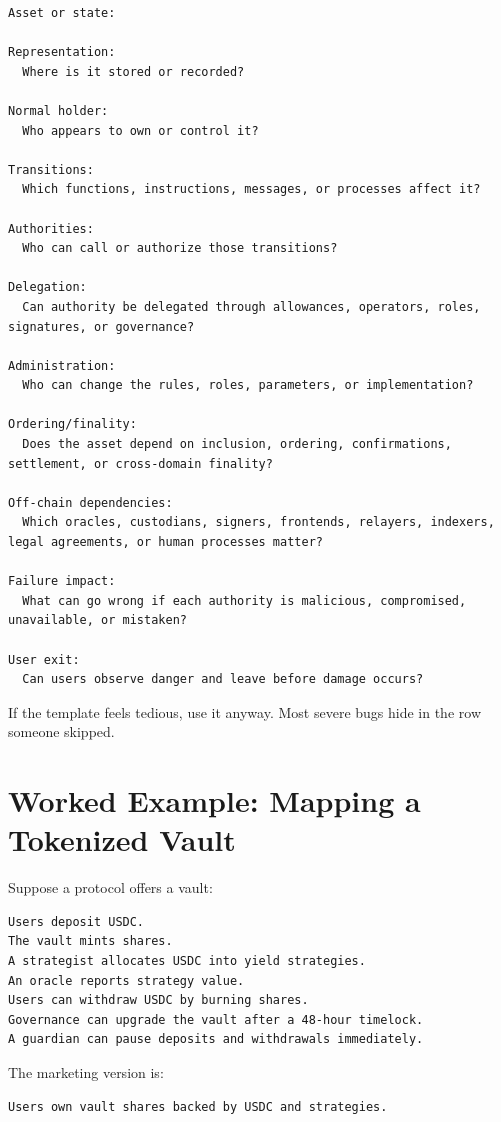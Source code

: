 \begin{lstlisting}
Asset or state:

Representation:
  Where is it stored or recorded?

Normal holder:
  Who appears to own or control it?

Transitions:
  Which functions, instructions, messages, or processes affect it?

Authorities:
  Who can call or authorize those transitions?

Delegation:
  Can authority be delegated through allowances, operators, roles, signatures, or governance?

Administration:
  Who can change the rules, roles, parameters, or implementation?

Ordering/finality:
  Does the asset depend on inclusion, ordering, confirmations, settlement, or cross-domain finality?

Off-chain dependencies:
  Which oracles, custodians, signers, frontends, relayers, indexers, legal agreements, or human processes matter?

Failure impact:
  What can go wrong if each authority is malicious, compromised, unavailable, or mistaken?

User exit:
  Can users observe danger and leave before damage occurs?
\end{lstlisting}

If the template feels tedious, use it anyway. Most severe bugs hide in
the row someone skipped.

\section{Worked Example: Mapping a Tokenized Vault}

Suppose a protocol offers a vault:

\begin{lstlisting}
Users deposit USDC.
The vault mints shares.
A strategist allocates USDC into yield strategies.
An oracle reports strategy value.
Users can withdraw USDC by burning shares.
Governance can upgrade the vault after a 48-hour timelock.
A guardian can pause deposits and withdrawals immediately.
\end{lstlisting}

The marketing version is:

\begin{lstlisting}
Users own vault shares backed by USDC and strategies.
\end{lstlisting}

